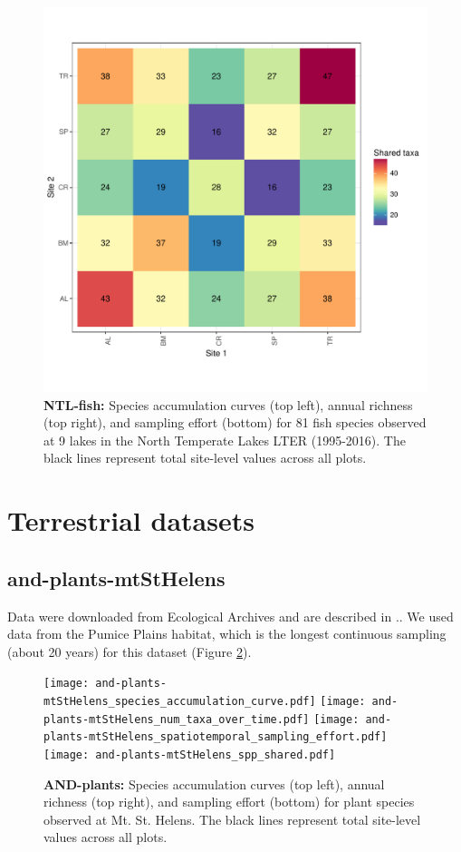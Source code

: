 \documentclass[11pt, oneside]{article}
\begin{document}
\begin{figure}[h!]
\includegraphics[scale = 0.4]{ntl-fish-stanleyLottig_spp_shared.pdf}
\caption{{\bf NTL-fish:} Species accumulation curves (top left),  annual richness (top right), and sampling effort (bottom)  for 81 fish species observed at 9 lakes in the North Temperate Lakes LTER (1995-2016). The black lines represent total site-level values across all plots.}
\label{ntl-fish}
\end{figure}


\section {Terrestrial datasets}


\subsection {and-plants-mtStHelens}
Data were downloaded from Ecological Archives \citep{and-plants} and are described in \citep{delMoral2005}..
We used data from the Pumice Plains habitat, which is the longest continuous sampling (about 20 years) for this dataset (Figure \ref{and-plants}).

\begin{figure}[h!]
\centering
\texttt{[image: and-plants-mtStHelens\_species\_accumulation\_curve.pdf]}
\texttt{[image: and-plants-mtStHelens\_num\_taxa\_over\_time.pdf]}
\texttt{[image: and-plants-mtStHelens\_spatiotemporal\_sampling\_effort.pdf]}
\texttt{[image: and-plants-mtStHelens\_spp\_shared.pdf]}
\caption{{\bf AND-plants:} Species accumulation curves (top left),  annual richness (top right), and sampling effort (bottom)  for plant species observed at Mt. St. Helens. The black lines represent total site-level values across all plots.}
\label{and-plants}
\end{figure}
\end{document}
